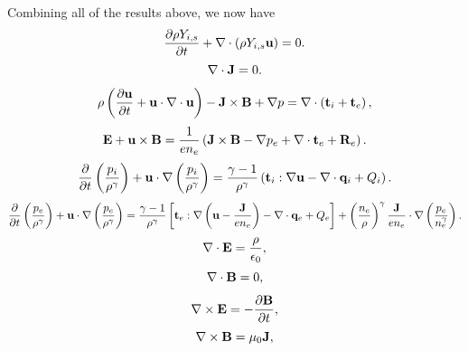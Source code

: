 \documentclass[a4paper,11pt]{report}
\begin{document}
Combining all of the results above, we now have
\begin{equation}
    \label{eq:generalized_MHD_mass}
    \frac{\partial \rho Y_{i,s}}{\partial t} + \nabla \cdot \left( \rho Y_{i,s} \mathbf{u} \right) = 0.
\end{equation}
\begin{equation}
    \label{eq:generalized_MHD_div_current}
    \nabla \cdot \mathbf{J} = 0.
\end{equation}
\begin{equation}
    \label{eq:generalized_MHD_vel}
    \rho \left( \frac{\partial \mathbf{u}}{\partial t} + \mathbf{u} \cdot \nabla \cdot \mathbf{u} \right) - \mathbf{J} \times \mathbf{B} + \nabla p = \nabla \cdot \left(  \mathbf{t}_i + \mathbf{t}_e \right),
\end{equation}
\begin{equation}
    \label{eq:generalized_MHD_ohms}
    \mathbf{E} + \mathbf{u} \times \mathbf{B} = \frac{1}{e n_e} \left( \mathbf{J} \times \mathbf{B} - \nabla p_e + \nabla \cdot \mathbf{t}_e + \mathbf{R}_e \right).
\end{equation}
\begin{equation}
    \label{eq:generalized_MHD_pi}
    \frac{\partial}{\partial t} \left( \frac{p_i}{\rho^\gamma} \right) + \mathbf{u} \cdot \nabla \left(\frac{p_i}{\rho^\gamma} \right) = \frac{\gamma - 1}{\rho^\gamma} \left( \mathbf{t}_i : \nabla \mathbf{u} - \nabla \cdot \mathbf{q}_i + Q_i \right).
\end{equation}
\begin{equation}
    \label{eq:generalized_MHD_pe}
    \frac{\partial}{\partial t} \left( \frac{p_e}{\rho^\gamma} \right) + \mathbf{u} \cdot \nabla \left(\frac{p_e}{\rho^\gamma} \right) = \frac{\gamma - 1}{\rho^\gamma} \left[ \mathbf{t}_e : \nabla \left( \mathbf{u} - \frac{\mathbf{J}}{en_e} \right) - \nabla \cdot \mathbf{q}_e + Q_e \right] + \left( \frac{n_e}{\rho} \right)^\gamma \frac{\mathbf{J}}{e n_e} \cdot \nabla \left( \frac{p_e}{n_e^\gamma} \right).
\end{equation}
\begin{equation}
    \label{eq:generalized_MHD_maxwell1}
    \nabla \cdot \mathbf{E} = \frac{\rho}{\epsilon_0},
\end{equation}
\begin{equation}
    \label{eq:generalized_MHD_maxwell2}
    \nabla \cdot \mathbf{B} = 0,
\end{equation}
\begin{equation}
    \label{eq:generalized_MHD_maxwell3}
    \nabla \times \mathbf{E} = -\frac{ \partial \mathbf{B}}{\partial t},
\end{equation}
\begin{equation}
    \label{eq:generalized_MHD_maxwell4}
    \nabla \times \mathbf{B} = \mu_0 \mathbf{J},
\end{equation}
\end{document}
